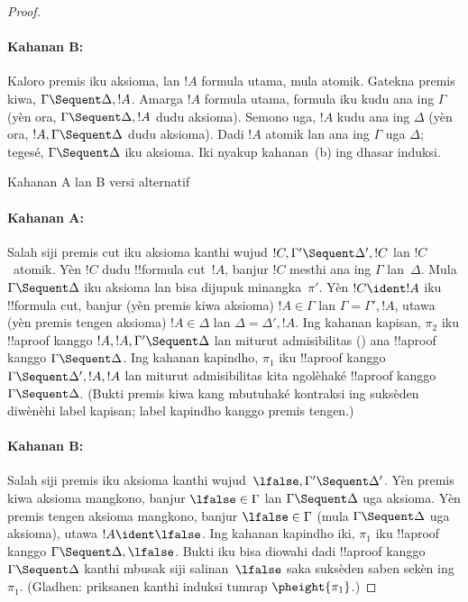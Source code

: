 \documentclass[../../../include/open-logic-section]{subfiles}
\begin{document}
\begin{proof}
\paragraph{Kahanan B:} Kaloro premis iku aksioma, lan $!A$
formula utama, mula atomik. Gatekna premis kiwa,
$\Gamma \Sequent \Delta, !A$. Amarga $!A$ formula utama,
formula iku kudu ana ing $\Gamma$ (yèn ora,
$\Gamma \Sequent \Delta, !A$ dudu aksioma). Semono uga,
$!A$ kudu ana ing $\Delta$ (yèn ora,
$!A, \Gamma \Sequent \Delta$ dudu aksioma).
Dadi $!A$ atomik lan ana ing $\Gamma$ uga $\Delta$;
tegesé, $\Gamma \Sequent \Delta$ iku aksioma. Iki
nyakup kahanan~(b) ing dhasar induksi.

\begin{center}
Kahanan A lan B versi alternatif
\end{center}

\paragraph{Kahanan A:} Salah siji premis cut iku aksioma
kanthi wujud $!C, \Gamma' \Sequent \Delta', !C$ lan $!C$~atomik.
Yèn $!C$ dudu !!{formula} cut~$!A$, banjur $!C$ mesthi
ana ing $\Gamma$ lan~$\Delta$. Mula $\Gamma \Sequent \Delta$
iku aksioma lan bisa dijupuk minangka~$\pi'$.
Yèn $!C \ident !A$ iku !!{formula} cut, banjur
(yèn premis kiwa aksioma) $!A \in \Gamma$ lan
$\Gamma = \Gamma', !A$, utawa (yèn premis tengen aksioma)
$!A \in \Delta$ lan $\Delta = \Delta', !A$.
Ing kahanan kapisan, $\pi_2$ iku !!a{proof} kanggo
$!A, !A, \Gamma' \Sequent \Delta$ lan miturut admisibilitas
\LeftR{\Contraction} ()
ana !!a{proof} kanggo $\Gamma \Sequent \Delta$.
Ing kahanan kapindho, $\pi_1$ iku !!a{proof} kanggo
$\Gamma \Sequent \Delta', !A, !A$ lan miturut admisibilitas
\RightR{\Contraction} kita ngolèhaké !!a{proof} kanggo
$\Gamma \Sequent \Delta$.
(Bukti premis kiwa kang mbutuhaké kontraksi ing suksèden diwènèhi label kapisan; label kapindho kanggo premis tengen.)

\paragraph{Kahanan B:} Salah siji premis iku aksioma kanthi
wujud~$\lfalse, \Gamma' \Sequent \Delta'$. Yèn premis kiwa
aksioma mangkono, banjur $\lfalse \in \Gamma$ lan
$\Gamma \Sequent \Delta$ uga aksioma. Yèn premis tengen
aksioma mangkono, banjur $\lfalse \in \Gamma$
(mula $\Gamma \Sequent \Delta$ uga aksioma), utawa
$!A \ident \lfalse$. Ing kahanan kapindho iki, $\pi_1$
iku !!a{proof} kanggo
$\Gamma \Sequent \Delta, \lfalse$. Bukti iku bisa diowahi
dadi !!a{proof} kanggo~$\Gamma \Sequent \Delta$ kanthi
mbusak siji salinan~$\lfalse$ saka suksèden saben sekèn
ing~$\pi_1$. (Gladhen: priksanen kanthi induksi tumrap
$\pheight{\pi_1}$.)


\end{proof}
\end{document}
